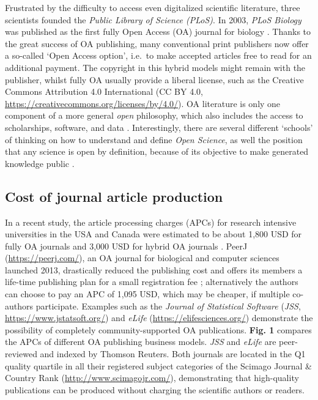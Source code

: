 \documentclass[10pt,fleqn]{wlpeerj}
\begin{document}
Frustrated
by
the
difficulty
to
access
even
digitalized
scientific
literature,
three
scientists
founded
the
\emph{Public
Library
of
Science
(PLoS)}.
In
2003,
\emph{PLoS
Biology}
was
published
as
the
first
fully
Open
Access
(OA)
journal
for
biology
\citep{brown_why_2003, eisen_publish_2003}.
Thanks
to
the
great
success
of OA
publishing,
many
conventional
print
publishers
now
offer
a
so-called
`Open
Access
option',
i.e.~to
make
accepted
articles
free
to
read
for
an
additional
payment.
The
copyright
in
this
hybrid
models
might
remain
with
the
publisher,
whilst
fully
OA
usually
provide
a
liberal
license,
such
as
the
Creative
Commons
Attribution
4.0
International
(CC
BY
4.0,
\url{https://creativecommons.org/licenses/by/4.0/}).
OA
literature
is
only
one
component
of a
more
general
\emph{open}
philosophy,
which
also
includes
the
access
to
scholarships,
software,
and
data
\citep{willinsky_unacknowledged_2005}.
Interestingly,
there
are
several
different
`schools'
of
thinking
on
how
to
understand
and
define
\emph{Open
Science},
as
well
the
position
that
any
science
is
open
by
definition,
because
of
its
objective
to
make
generated
knowledge
public
\citep{fecher_open_2014}.

\subsection{Cost
of
journal
article
production}\label{cost-of-journal-article-production}

In a
recent
study,
the
article
processing
charges
(APCs)
for
research
intensive
universities
in
the
USA
and
Canada
were
estimated
to be
about
1,800
USD
for
fully
OA
journals
and
3,000
USD
for
hybrid
OA
journals
\citep{solomon_article_2016}.
PeerJ
(\url{https://peerj.com/}),
an OA
journal
for
biological
and
computer
sciences
launched
2013,
drastically
reduced
the
publishing
cost
and
offers
its
members
a
life-time
publishing
plan
for a
small
registration
fee
\citep{van_noorden_journal_2012};
alternatively
the
authors
can
choose
to
pay
an
APC
of
1,095
USD,
which
may
be
cheaper,
if
multiple
co-authors
participate.
Examples
such
as
the
\emph{Journal
of
Statistical
Software}
(\emph{JSS},
\url{https://www.jstatsoft.org/})
and
\emph{eLife}
(\url{https://elifesciences.org/})
demonstrate
the
possibility
of
completely
community-supported
OA
publications.
\textbf{Fig.
1}
compares
the
APCs
of
different
OA
publishing
business
models.
\emph{JSS}
and
\emph{eLife}
are
peer-reviewed
and
indexed
by
Thomson
Reuters.
Both
journals
are
located
in
the
Q1
quality
quartile
in
all
their
registered
subject
categories
of
the
Scimago
Journal
\&
Country
Rank
(\url{http://www.scimagojr.com/}),
demonstrating
that
high-quality
publications
can
be
produced
without
charging
the
scientific
authors
or
readers.
\end{document}
